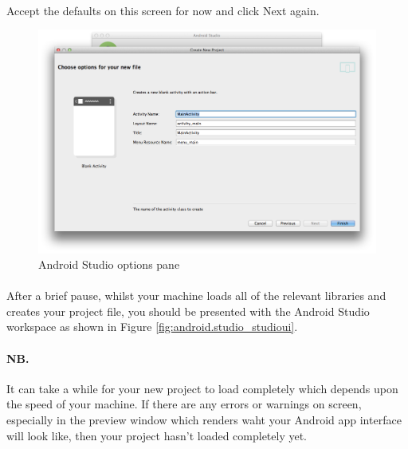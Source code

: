 \documentclass[12pt, a4paper, twoside]{book}
\begin{document}
\paragraph{} Accept the defaults on this screen for now and click Next again.

\begin{figure}[H]
\centering
\includegraphics[width=\textwidth]{images/android-studio_07_options}
\caption{Android Studio options pane}
\label{fig:android.studio_options}
\end{figure}

\paragraph{} After a brief pause, whilst your machine loads all of the relevant libraries and creates your project file, you should be presented with the Android Studio workspace as shown in Figure \ref{fig:android.studio_studioui}.

\paragraph{NB.} It can take a while for your new project to load completely which depends upon the speed of your machine. If there are any errors or warnings on screen, especially in the preview window which renders waht your Android app interface will look like, then your project hasn't loaded completely yet.
\end{document}
